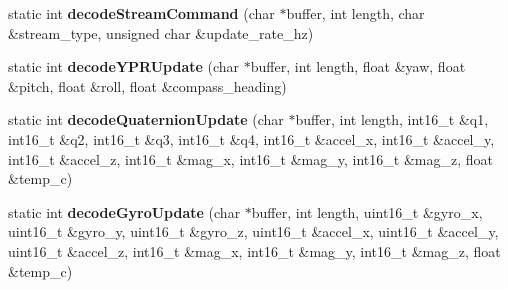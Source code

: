 \begin{DoxyCompactItemize}
\item 
\hypertarget{class_i_m_u_protocol_af6c852e5e0fc5fe540d23920e0e2d3a0}{}static int {\bfseries decode\+Stream\+Command} (char $\ast$buffer, int length, char \&stream\+\_\+type, unsigned char \&update\+\_\+rate\+\_\+hz)\label{class_i_m_u_protocol_af6c852e5e0fc5fe540d23920e0e2d3a0}

\item 
\hypertarget{class_i_m_u_protocol_a2a833cb88f11b50e16001e8197ab1664}{}static int {\bfseries decode\+Y\+P\+R\+Update} (char $\ast$buffer, int length, float \&yaw, float \&pitch, float \&roll, float \&compass\+\_\+heading)\label{class_i_m_u_protocol_a2a833cb88f11b50e16001e8197ab1664}

\item 
\hypertarget{class_i_m_u_protocol_a2706f477f4b02197d09d55e436b24fd7}{}static int {\bfseries decode\+Quaternion\+Update} (char $\ast$buffer, int length, int16\+\_\+t \&q1, int16\+\_\+t \&q2, int16\+\_\+t \&q3, int16\+\_\+t \&q4, int16\+\_\+t \&accel\+\_\+x, int16\+\_\+t \&accel\+\_\+y, int16\+\_\+t \&accel\+\_\+z, int16\+\_\+t \&mag\+\_\+x, int16\+\_\+t \&mag\+\_\+y, int16\+\_\+t \&mag\+\_\+z, float \&temp\+\_\+c)\label{class_i_m_u_protocol_a2706f477f4b02197d09d55e436b24fd7}

\item 
\hypertarget{class_i_m_u_protocol_a39d4917878a4af8a173962c1991bbb95}{}static int {\bfseries decode\+Gyro\+Update} (char $\ast$buffer, int length, uint16\+\_\+t \&gyro\+\_\+x, uint16\+\_\+t \&gyro\+\_\+y, uint16\+\_\+t \&gyro\+\_\+z, uint16\+\_\+t \&accel\+\_\+x, uint16\+\_\+t \&accel\+\_\+y, uint16\+\_\+t \&accel\+\_\+z, int16\+\_\+t \&mag\+\_\+x, int16\+\_\+t \&mag\+\_\+y, int16\+\_\+t \&mag\+\_\+z, float \&temp\+\_\+c)\label{class_i_m_u_protocol_a39d4917878a4af8a173962c1991bbb95}

\end{DoxyCompactItemize}
